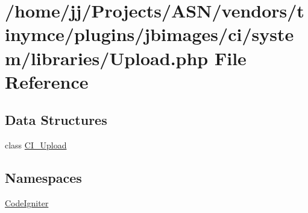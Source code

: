 \hypertarget{_upload_8php}{}\section{/home/jj/\+Projects/\+A\+S\+N/vendors/tinymce/plugins/jbimages/ci/system/libraries/\+Upload.php File Reference}
\label{_upload_8php}
\subsection*{Data Structures}
\begin{DoxyCompactItemize}
\item 
class \hyperlink{class_c_i___upload}{C\+I\+\_\+\+Upload}
\end{DoxyCompactItemize}
\subsection*{Namespaces}
\begin{DoxyCompactItemize}
\item 
 \hyperlink{namespace_code_igniter}{Code\+Igniter}
\end{DoxyCompactItemize}

